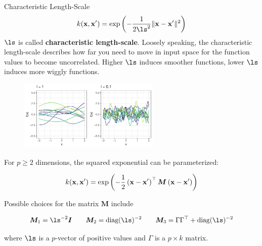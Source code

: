 \documentclass[11pt,compress,t,notes=noshow, xcolor=table]{beamer}
\begin{document}
\begin{frame}[c,allowframebreaks]{Characteristic Length-Scale}
    $$k(\xv, \xv^\prime) = \exp\left(-\frac{1}{2\ls^2}\|\xv - \xv^\prime\|^2\right)$$
$\ls$ is called \textbf{characteristic length-scale}. Loosely speaking, the characteristic length-scale describes how far you need to move in input space for the function values to become uncorrelated. Higher $\ls$ induces smoother functions, lower $\ls$ induces more wiggly functions.

\begin{figure}
\includegraphics[width=0.6\textwidth]{figure/gp_sample/varying_length_scale.pdf}
\end{figure}


\framebreak

For $p \geq 2$ dimensions, the squared exponential can be parameterized:

$$
k(\mathbf{x}, \mathbf{x}^\prime) = \exp\,\biggl(- \frac{1}{2}\left(\mathbf{x} - \mathbf{x}^\prime\right)^\top\bm{M}\left(\mathbf{x} - \mathbf{x}^\prime \right)\biggr)
$$

Possible choices for the matrix $\bm{M}$ include

$$
\bm{M}_1 = \ls^{-2}\id \qquad \bm{M}_2 = \text{diag}(\bm{\ls})^{-2} \qquad \bm{M}_3 = \Gamma \Gamma^\top + \text{diag}(\bm{\ls})^{-2}
$$

where $\bm{\ls}$ is a $p$-vector of positive values and $\Gamma$ is a $p \times k$ matrix. 

\lz


\end{frame}
\end{document}
